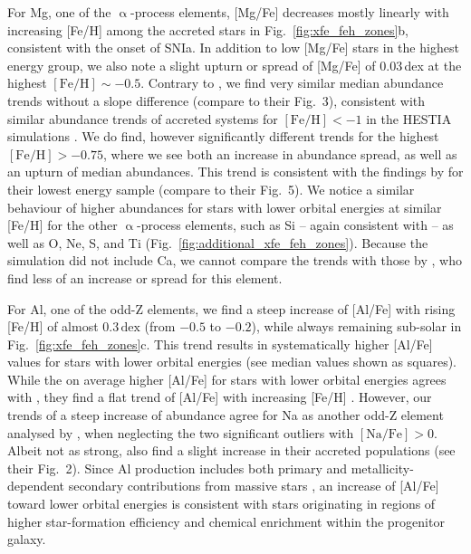 \documentclass[fleqn,usenatbib]{mnras}
\newcommand{\changed}[1]{{{#1}}}
\begin{document}
For Mg, one of the $\upalpha$-process elements, [Mg/Fe] decreases mostly linearly with increasing [Fe/H] among the accreted stars in Fig.~\ref{fig:xfe_feh_zones}b, consistent with the onset of SNIa. In addition to low [Mg/Fe] stars in the highest energy group, we also note a slight upturn or spread of [Mg/Fe] of 0.03\,dex at the highest $\mathrm{[Fe/H]} \sim -0.5$. Contrary to \citet{Skuladottir2025}, we find very similar median abundance trends without a slope difference (compare to their Fig.~3)\changed{, consistent with similar abundance trends of accreted systems for $\mathrm{[Fe/H] < -1}$ in the HESTIA simulations \citep{Khoperskov2023c}}. We do find, however significantly different trends for the highest $\mathrm{[Fe/H]} > -0.75$, where we see both an increase in abundance spread, as well as an upturn of median abundances. This trend is consistent with the findings by \citet{Skuladottir2025} for their lowest energy sample (compare to their Fig.~5). We notice a similar behaviour of higher abundances for stars with lower orbit\changed{al} energies at similar [Fe/H] for the other $\upalpha$-process elements, such as Si -- again consistent with \citet{Skuladottir2025} -- as well as O, Ne, S, and Ti (Fig.~\ref{fig:additional_xfe_feh_zones}). Because the simulation did not include Ca, we cannot compare the trends with those by \citet{Skuladottir2025}, who find less of an increase or spread for this element.

For Al, one of the odd-Z elements, we find a steep increase of [Al/Fe] with rising [Fe/H] of almost $0.3\,\mathrm{dex}$ (from $-0.5$ to $-0.2$), while always remaining sub-solar in Fig.~\ref{fig:xfe_feh_zones}c. This \changed{trend results in systematically} higher [Al/Fe] values for \changed{stars with lower orbital energies} (see median values shown as squares). While the on average higher [Al/Fe] for stars with lower orbital energies agrees with \citet{Skuladottir2025}, they find a flat trend of [Al/Fe] with increasing [Fe/H] \citep[see also][]{Feuillet2021, Ernandes2025}. However, our trends of a steep increase of abundance agree for Na as another odd-Z element analysed by \citet[][see their Fig.~6]{Skuladottir2025}, when neglecting the two significant outliers with $\mathrm{[Na/Fe]} > 0$. Albeit not as strong, \citet{Belokurov2022} also find a slight increase in their accreted populations (see their Fig.~2). \changed{Since Al production includes both primary and metallicity-dependent secondary contributions from massive stars \citep[e.g.][]{Kobayashi2020}, an increase of [Al/Fe] toward lower orbital energies is consistent with stars originating in regions of higher star-formation efficiency and chemical enrichment within the progenitor galaxy.}
\end{document}
